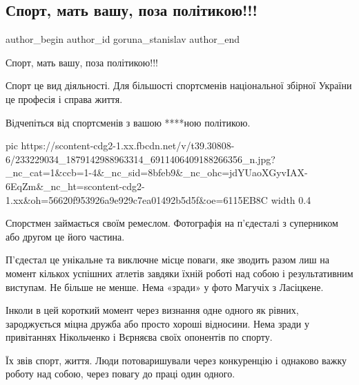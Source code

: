  
 
 
 
 
 
\subsection{Спорт, мать вашу, поза політикою!!!}
\label{sec:08_08_2021.fb.goruna_stanislav.1.sport_poza_politikoju}
 
\ifcmt
 author_begin
   author_id goruna_stanislav
 author_end
\fi

Спорт, мать вашу, поза політикою!!!

Спорт це вид діяльності. Для більшості спортсменів національної збірної України
це професія і справа життя. 

Відчепіться від спортсменів з вашою ****ною політикою. 

\ifcmt
  pic https://scontent-cdg2-1.xx.fbcdn.net/v/t39.30808-6/233229034_1879142988963314_6911406409188266356_n.jpg?_nc_cat=1&ccb=1-4&_nc_sid=8bfeb9&_nc_ohc=jdYUaoXGyvIAX-6EqZm&_nc_ht=scontent-cdg2-1.xx&oh=56620f953926a9e929c7ea01492b5d5f&oe=6115EB8C
  width 0.4
\fi

Спорстмен займається своїм ремеслом. Фотографія на п’єдесталі з суперником або
другом це його частина. 

П’єдестал це унікальне та виключне місце поваги, яке зводить разом лиш на
момент кількох успішних атлетів  завдяки їхній роботі над собою і
результативним виступам.  Не більше не менше. Нема «зради» у фото Магучіх з
Ласіцкене.

Інколи в цей короткий момент через визнання одне одного як рівних, зароджується
міцна дружба або просто хороші відносини. Нема зради у привітаннях Нікольченко
і Вєрняєва своїх опонентів по спорту.

Їх звів спорт, життя. Люди потоваришували через конкуренцію і однаково важку
роботу над собою, через повагу до праці один одного.

